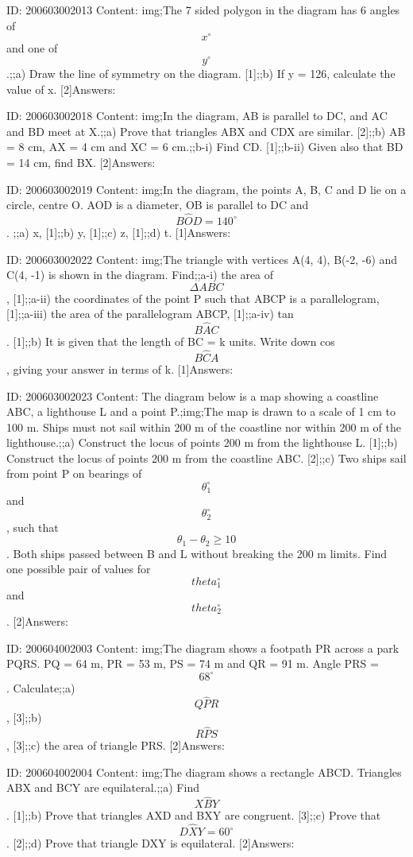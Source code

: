 \documentclass{article}
\begin{document}
ID: 200603002013
Content:
img;The 7 sided polygon in the diagram has 6 angles of $$x^{\circ}$$ and one of $$y^{\circ}$$.;;a) Draw the line of symmetry on the diagram. [1];;b) If y = 126, calculate the value of x. [2]Answers:

ID: 200603002018
Content:
img;In the diagram, AB is parallel to DC, and AC and BD meet at X.;;a) Prove that triangles ABX and CDX are similar. [2];;b) AB = 8 cm, AX = 4 cm and XC = 6 cm.;;b-i) Find CD. [1];;b-ii) Given also that BD = 14 cm, find BX. [2]Answers:

ID: 200603002019
Content:
img;In the diagram, the points A, B, C and D lie on a circle, centre O. AOD is a diameter, OB is parallel to DC and $$B \hat OD=140^{\circ}$$. ;;a) x, [1];;b) y, [1];;c) z, [1];;d) t. [1]Answers:

ID: 200603002022
Content:
img;The triangle with vertices A(4, 4), B(-2, -6) and C(4, -1) is shown in the diagram. Find;;a-i) the area of $$\Delta ABC$$, [1];;a-ii) the coordinates of the point P such that ABCP is a parallelogram, [1];;a-iii) the area of the parallelogram ABCP, [1];;a-iv) tan $$B \hat AC$$. [1];;b) It is given that the length of BC = k units. Write down cos $$B \hat CA$$, giving your answer in terms of k. [1]Answers:

ID: 200603002023
Content:
The diagram below is a map showing a coastline ABC, a lighthouse L and a point P.;img;The map is drawn to a scale of 1 cm to 100 m. Ships must not sail within 200 m of the coastline nor within 200 m of the lighthouse.;;a) Construct the locus of points 200 m from the lighthouse L. [1];;b) Construct the locus of points 200 m from the coastline ABC. [2];;c) Two ships sail from point P on bearings of $$\theta_1^{\circ}$$ and $$\theta_2^{\circ}$$, such that $$\theta_1 - \theta_2 \geq 10$$. Both ships passed between B and L without breaking the 200 m limits. Find one possible pair of values for $$theta_1^{\circ}$$ and $$theta_2^{\circ}$$. [2]Answers:

ID: 200604002003
Content:
img;The diagram shows a footpath PR across a park PQRS. PQ = 64 m, PR = 53 m, PS = 74 m and QR = 91 m. Angle PRS = $$68^{\circ}$$. Calculate;;a) $$Q \hat PR $$, [3];;b) $$R \hat PS$$, [3];;c) the area of triangle PRS. [2]Answers:

ID: 200604002004
Content:
img;The diagram shows a rectangle ABCD. Triangles ABX and BCY are equilateral.;;a) Find $$X \hat BY$$. [1];;b) Prove that triangles AXD and BXY are congruent. [3];;c) Prove that $$D \hat XY=60^{\circ}$$. [2];;d) Prove that triangle DXY is equilateral. [2]Answers:
\end{document}
